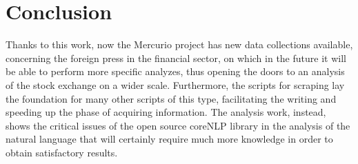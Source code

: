\section{Conclusion}
Thanks to this work, now the Mercurio project has new data collections available, concerning the foreign press in the financial sector, on which in the future it will be able to perform more specific analyzes, thus opening the doors to an analysis of the stock exchange on a wider scale. Furthermore, the scripts for scraping lay the foundation for many other scripts of this type, facilitating the writing and speeding up the phase of acquiring information. The analysis work, instead, shows the critical issues of the open source coreNLP library in the analysis of the natural language that will certainly require much more knowledge in order to obtain satisfactory results.